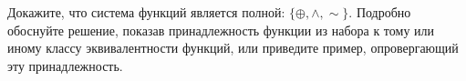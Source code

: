 \question
Докажите, что система функций является полной: $\{\oplus, \wedge, \sim\}$. Подробно обоснуйте решение, показав  принадлежность функции из набора к тому или иному классу эквивалентности функций, или приведите пример, опровергающий эту принадлежность.

